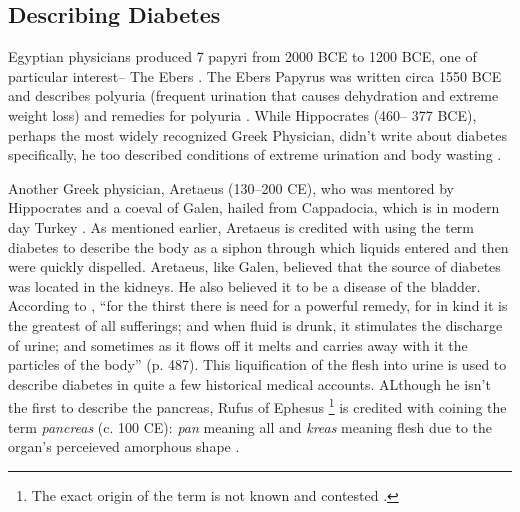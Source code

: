\documentclass[12pt]{article}
\begin{document}
\subsection{Describing Diabetes}

Egyptian physicians produced 7 papyri from 2000 BCE to 1200 BCE, one of particular interest-- The Ebers \citep{bryan_1974_ancient}. The Ebers Papyrus was written circa 1550 BCE and describes polyuria (frequent urination that causes dehydration and extreme weight loss) and remedies for polyuria \citep{bryan_1974_ancient}. 
While Hippocrates (460-- 377 BCE), perhaps the most widely recognized Greek Physician, didn't write about diabetes specifically, he too described conditions of extreme urination and body wasting \citep{avicenna_1930_treatise}. 

Another Greek physician, Aretaeus (130--200 CE), who was mentored by Hippocrates and a coeval of Galen, hailed from Cappadocia, which is in modern day Turkey \citep{henschen_1969_term}. As mentioned earlier, Aretaeus is credited with using the term diabetes to describe the body as a siphon through which liquids entered and then were quickly dispelled. Aretaeus, like Galen, believed that the source of diabetes was located in the kidneys. He also believed it to be a disease of the bladder. According to \citet{aretaeus_1856_extant},
``for the thirst there is need for a powerful remedy, for in kind it is the greatest of all sufferings; and when fluid is drunk, it stimulates the discharge of urine; and sometimes as it flows off it melts and carries away with it the particles of the body'' (p. 487).  This liquification of the flesh into urine is used to describe diabetes in quite a few historical medical accounts. ALthough he isn't the first to describe the pancreas, Rufus of Ephesus \footnote {The exact origin of the term is not known and contested \citep{sanders_2001_philatelic}.} is credited with coining the term \textit{pancreas} (c. 100 CE): \textit{pan} meaning all and \textit{kreas} meaning flesh due to the organ's perceieved amorphous shape \citep{papaspyros_1964_history}. 
\end{document}
